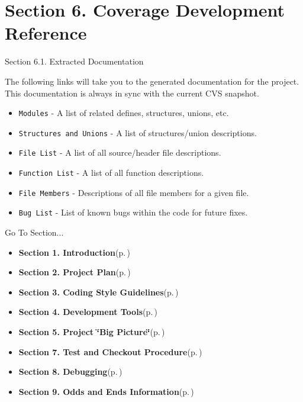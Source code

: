 \section{Section 6.  Coverage Development Reference}\label{page_code_details}
\begin{Desc}
\item[Section 6.1. Extracted Documentation]\end{Desc}
\begin{Desc}
\item[]The following links will take you to the generated documentation for the project. This documentation is always in sync with the current CVS snapshot.\end{Desc}
\begin{Desc}
\item[]\begin{itemize}
\item {\tt Modules} - A list of related defines, structures, unions, etc.\item {\tt Structures and Unions} - A list of structures/union descriptions.\item {\tt File List} - A list of all source/header file descriptions.\item {\tt Function List} - A list of all function descriptions.\item {\tt File Members} - Descriptions of all file members for a given file.\item {\tt Bug List} - List of known bugs within the code for future fixes.\end{itemize}
\end{Desc}




\begin{Desc}
\item[Go To Section...]\begin{itemize}
\item {\bf Section 1.  Introduction}{\rm (p.\,\pageref{page_intro})}\item {\bf Section 2.  Project Plan}{\rm (p.\,\pageref{page_project_plan})}\item {\bf Section 3.  Coding Style Guidelines}{\rm (p.\,\pageref{page_code_style})}\item {\bf Section 4.  Development Tools}{\rm (p.\,\pageref{page_tools})}\item {\bf Section 5.  Project \char`\"{}Big Picture\char`\"{}}{\rm (p.\,\pageref{page_big_picture})}\item {\bf Section 7.  Test and Checkout Procedure}{\rm (p.\,\pageref{page_testing})}\item {\bf Section 8.  Debugging}{\rm (p.\,\pageref{page_debugging})}\item {\bf Section 9.  Odds and Ends Information}{\rm (p.\,\pageref{page_misc})} \end{itemize}
\end{Desc}
